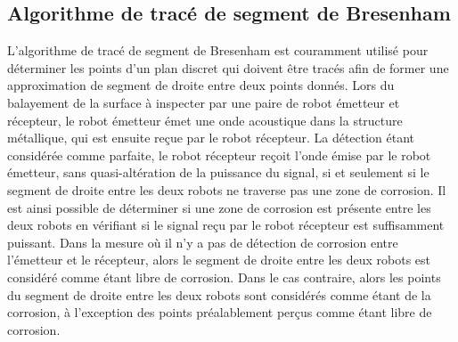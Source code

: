 \documentclass[francais,RandD]{rapportPFE}
\begin{document}
		\subsection*{Algorithme de tracé de segment de Bresenham}
			L'algorithme de tracé de segment de Bresenham est couramment utilisé pour déterminer les points d'un plan discret qui doivent être tracés afin de former une approximation de segment de droite entre deux points donnés.
			Lors du balayement de la surface à inspecter par une paire de robot émetteur et récepteur, le robot émetteur émet une onde acoustique dans la structure métallique, qui est ensuite reçue par le robot récepteur.
			La détection étant considérée comme parfaite, le robot récepteur reçoit l'onde émise par le robot émetteur, sans quasi-altération de la puissance du signal, si et seulement si le segment de droite entre les deux robots ne traverse pas une zone de corrosion.
			Il est ainsi possible de déterminer si une zone de corrosion est présente entre les deux robots en vérifiant si le signal reçu par le robot récepteur est suffisamment puissant.
			Dans la mesure où il n'y a pas de détection de corrosion entre l'émetteur et le récepteur, alors le segment de droite entre les deux robots est considéré comme étant libre de corrosion.
			Dans le cas contraire, alors les points du segment de droite entre les deux robots sont considérés comme étant de la corrosion, à l'exception des points préalablement perçus comme étant libre de corrosion.
\end{document}
